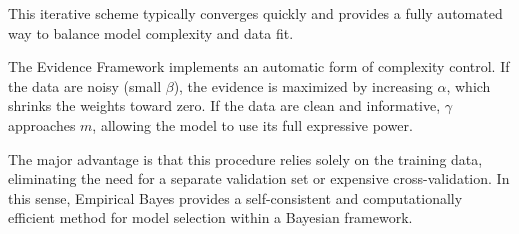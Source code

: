 \medskip
This iterative scheme typically converges quickly and provides a fully automated way to balance model complexity and data fit.

\medskip


The Evidence Framework implements an automatic form of complexity control. If the data are noisy (small $\beta$), the evidence is maximized by increasing $\alpha$, which shrinks the weights toward zero. If the data are clean and informative, $\gamma$ approaches $m$, allowing the model to use its full expressive power.

The major advantage is that this procedure relies solely on the training data, eliminating the need for a separate validation set or expensive cross-validation. In this sense, Empirical Bayes provides a self-consistent and computationally efficient method for model selection within a Bayesian framework.




%
%